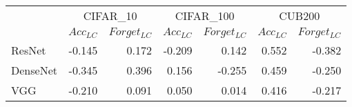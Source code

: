 \begin{table}[h]
\centering
\begin{tabular}{lrrrrrr}
\toprule
{} & \multicolumn{2}{c}{CIFAR_10} & \multicolumn{2}{c}{CIFAR_100} & \multicolumn{2}{c}{CUB200} \\
{} & $Acc_{LC}$ & $Forget_{LC}$ & $Acc_{LC}$ & $Forget_{LC}$ & $Acc_{LC}$ & $Forget_{LC}$ \\
\midrule
ResNet   &     -0.145 &         0.172 &     -0.209 &         0.142 &      0.552 &        -0.382 \\
DenseNet &     -0.345 &         0.396 &      0.156 &        -0.255 &      0.459 &        -0.250 \\
VGG      &     -0.210 &         0.091 &      0.050 &         0.014 &      0.416 &        -0.217 \\
\bottomrule
\end{tabular}
\end{table}
